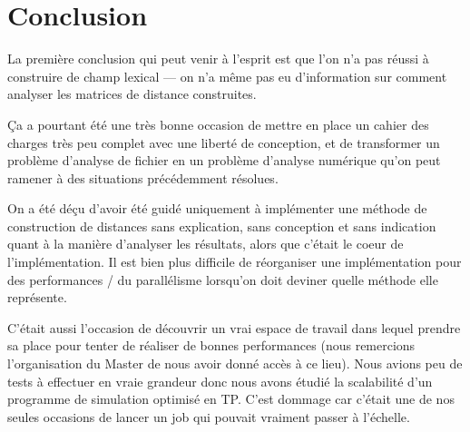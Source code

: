 \section{Conclusion}

La première conclusion qui peut venir à l'esprit est que
l'on n'a pas réussi à construire de champ lexical \----
on n'a même pas eu d'information sur comment analyser
les matrices de distance construites.

Ça a pourtant été une très bonne occasion de
mettre en place un cahier des charges très peu complet
avec une liberté de conception, et de transformer un
problème d'analyse de fichier en un problème d'analyse numérique
qu'on peut ramener à des situations précédemment résolues.

On a été déçu d'avoir été guidé uniquement à implémenter
une méthode de construction de distances sans explication,
sans conception et sans indication quant à la manière
d'analyser les résultats, alors que c'était le coeur
de l'implémentation. Il est bien plus difficile de réorganiser
une implémentation pour des performances / du parallélisme
lorsqu'on doit deviner quelle méthode elle représente.

C'était aussi l'occasion de découvrir un vrai espace
de travail dans lequel prendre sa place pour tenter de
réaliser de bonnes performances
(nous remercions l'organisation du Master de nous avoir donné
accès à ce lieu).
Nous avions peu de tests à effectuer en vraie grandeur
donc nous avons étudié la scalabilité d'un programme
de simulation optimisé en TP.
C'est dommage car c'était une de nos seules occasions
de lancer un job qui pouvait vraiment passer à l'échelle.
